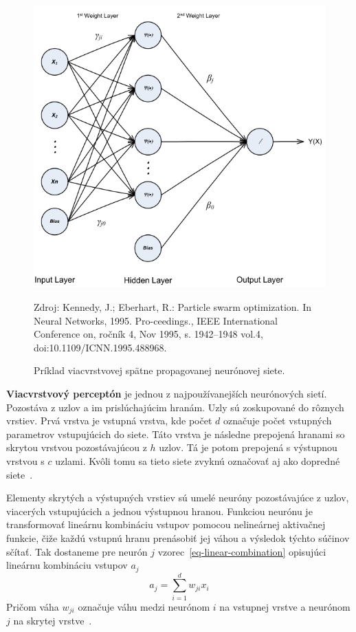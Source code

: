 \documentclass[a4paper,slovak,12pt,appendix]{article}
\newcommand{\source}[1]{\caption*{\footnotesize Zdroj: {#1}} }
\begin{document}
\begin{figure}[!ht]
  \centering
  \includegraphics[width=\textwidth]{neural_network.png}
  \caption{Príklad viacvrstvovej spätne propagovanej neurónovej siete.}
	\source{Kennedy, J.; Eberhart, R.: Particle swarm optimization. In Neural
					Networks, 1995. Pro-ceedings., IEEE International Conference on,
					ročník 4, Nov 1995, s. 1942–1948 vol.4, doi:10.1109/ICNN.1995.488968.}
  \label{fig-neural-network}
\end{figure}

\textbf{Viacvrstvový perceptón} je jednou z najpoužívanejších neurónových
sietí. Pozostáva z uzlov a im prislúchajúcim hranám. Uzly sú zoskupované do
rôznych vrstiev. Prvá vrstva je vstupná vrstva, kde počet $d$ označuje počet
vstupných parametrov vstupujúcich do siete. Táto vrstva je následne prepojená
hranami so skrytou vrstvou pozostávajúcou z $h$ uzlov. Tá je potom prepojená
s výstupnou vrstvou s $c$ uzlami. Kvôli tomu sa tieto siete zvyknú označovať aj
ako dopredné siete~\cite{Merz1998}.

Elementy skrytých a výstupných vrstiev sú umelé neuróny pozostávajúce z uzlov,
viacerých vstupujúcich a jednou výstupnou hranou. Funkciou neurónu je
transformovať lineárnu kombináciu vstupov pomocou nelineárnej aktivačnej
funkcie, čiže každú vstupnú hranu prenásobiť jej váhou a výsledok týchto súčinov
sčítať. Tak dostaneme pre neurón $j$ vzorec~\ref{eq-linear-combination}
opisujúci lineárnu kombináciu vstupov $a_j$
\begin{equation}
  a_j = \sum_{i=1}^{d} w_{ji} x_i
  \label{eq-linear-combination}
\end{equation}
Pričom váha $w_{ji}$ označuje váhu medzi neurónom $i$ na vstupnej vrstve
a neurónom $j$ na skrytej vrstve~\cite{Merz1998}.
\end{document}
